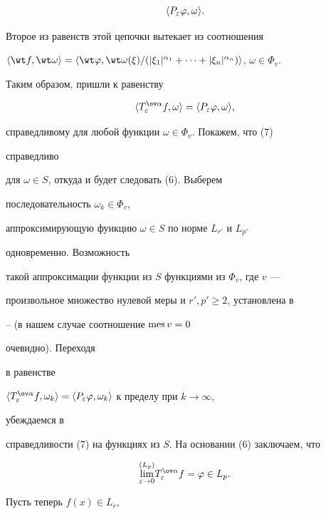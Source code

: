 \begin{pf}
\begin{gather*}
\la P_\varepsilon\varphi,\omega\ra.


\end{gather*}


Второе из равенств этой цепочки вытекает из соотношения


$\la\wt f,\wt\omega\ra=\la\wt\varphi,\wt\omega(\xi)/


(|\xi_1|^{\alpha_1}+\dotsb+|\xi_n|^{\alpha_n})\ra$, $\omega\in\Phi_v$.


Таким образом, пришли к равенству


\begin{equation}


\la T^{\ov\alpha}_\varepsilon f,\omega\ra =\la


P_\varepsilon\varphi,\omega\ra,


\end{equation}


справедливому для любой функции $\omega\in\Phi_v$. Покажем, что (7)


справедливо


для $\omega\in S$, откуда и будет следовать (6). Выберем


последовательность $\omega_k\in\Phi_v$,


аппроксимирующую функцию $\omega\in S$ по норме $L_{r'}$ и $L_{p'}$


одновременно. Возможность


такой аппроксимации функции из $S$ функциями из $\Phi_v$, где $v$ ---


произвольное множество нулевой меры и $r',p'\ge 2$, установлена в


\cite{17}--\cite{19} (в нашем случае соотношение $\text{mes\,}v=0$


очевидно). Переходя


в равенстве


$\la T^{\ov\alpha}_\varepsilon f,\omega_k\ra=


\la P_\varepsilon\varphi,\omega_k\ra$ к пределу при $k\to\infty$,


убеждаемся в


справедливости (7) на функциях из $S$. На основании (6) заключаем, что


$$


\overset{(L_p)}{\lim_{\varepsilon\to 0}}{}


T^{\ov\alpha}_\varepsilon f=\varphi\in L_p.


$$





Пусть теперь $f(x)\in L_r$,



\end{pf}
